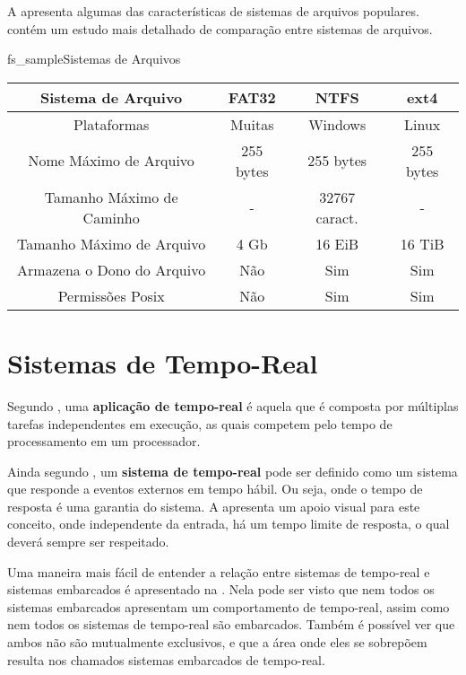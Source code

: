 
A  apresenta algumas das características de sistemas de arquivos populares.  contém um estudo mais detalhado de comparação entre sistemas de arquivos.

\begin{tabela}{fs_sample}{Sistemas de Arquivos}
	\begin{tabular}{|c|c|c|c|}
		\hline 
		Sistema de Arquivo & FAT32 & NTFS & ext4 \\ 
		\hline \hline
		Plataformas & Muitas & Windows & Linux \\ 
		\hline 
		Nome Máximo de Arquivo & 255 bytes & 255 bytes & 255 bytes \\ 
		\hline 
		Tamanho Máximo de Caminho & - & 32767 caract. & - \\ 
		\hline 
		Tamanho Máximo de Arquivo & 4 Gb & 16 EiB & 16 TiB \\ 
		\hline 
		Armazena o Dono do Arquivo & Não & Sim & Sim \\ 
		\hline 
		Permissões Posix & Não & Sim & Sim \\ 
		\hline 
	\end{tabular}
\end{tabela}

\section{Sistemas de Tempo-Real}

Segundo , uma \textbf{aplicação de tempo-real} é aquela que é composta por múltiplas tarefas independentes em execução, as quais competem pelo tempo de processamento em um processador.

Ainda segundo , um \textbf{sistema de tempo-real} pode ser definido como um sistema que responde a eventos externos em tempo hábil. Ou seja, onde o tempo de resposta é uma garantia do sistema. A  apresenta um apoio visual para este conceito, onde independente da entrada, há um tempo limite de resposta, o qual deverá sempre ser respeitado.


Uma maneira mais fácil de entender a relação entre sistemas de tempo-real e sistemas embarcados é apresentado na . Nela pode ser visto que nem todos os sistemas embarcados apresentam um comportamento de tempo-real, assim como nem todos os sistemas de tempo-real são embarcados. Também é possível ver que ambos não são mutualmente exclusivos, e que a área onde eles se sobrepõem resulta nos chamados sistemas embarcados de tempo-real.


